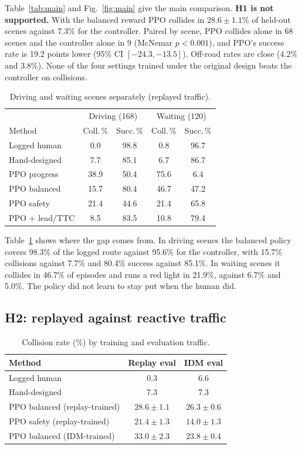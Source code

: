 \documentclass[conference]{IEEEtran}
\newcommand{\pp}{\phantom{0}}
\begin{document}
Table~\ref{tab:main} and Fig.~\ref{fig:main} give the main comparison. \textbf{H1 is not
supported.} With the balanced reward PPO collides in $28.6\pm1.1$\% of held-out scenes
against 7.3\% for the controller. Paired by scene, PPO collides alone in 68 scenes and
the controller alone in 9 (McNemar $p<0.001$), and PPO's success rate is 19.2 points
lower (95\% CI $[-24.3,-13.5]$). Off-road rates are close (4.2\% and 3.8\%). None of the
four settings trained under the original design beats the controller on collisions.

\begin{table}[t]
\caption{Driving and waiting scenes separately (replayed traffic).}\label{tab:split}
\centering\small
\begin{tabular}{@{}lcccc@{}}
\toprule
 & \multicolumn{2}{c}{Driving (168)} & \multicolumn{2}{c}{Waiting (120)} \\
Method & Coll.\,\% & Succ.\,\% & Coll.\,\% & Succ.\,\% \\
\midrule
Logged human & 0.0 & 98.8 & 0.8 & 96.7 \\
Hand-designed & 7.7 & 85.1 & 6.7 & 86.7 \\
PPO progress & 38.9 & 50.4 & 75.6 & \pp6.4 \\
PPO balanced & 15.7 & 80.4 & 46.7 & 47.2 \\
PPO safety & 21.4 & 44.6 & 21.4 & 65.8 \\
PPO + lead/TTC & \pp8.5 & 83.5 & 10.8 & 79.4 \\
\bottomrule
\end{tabular}
\end{table}

Table~\ref{tab:split} shows where the gap comes from. In driving scenes the balanced
policy covers 98.3\% of the logged route against 95.6\% for the controller, with 15.7\%
collisions against 7.7\% and 80.4\% success against 85.1\%. In waiting scenes it collides
in 46.7\% of episodes and runs a red light in 21.9\%, against 6.7\% and 5.0\%. The policy
did not learn to stay put when the human did.

\subsection{H2: replayed against reactive traffic}\label{sec:h2}

\begin{table}[t]
\caption{Collision rate (\%) by training and evaluation traffic.}\label{tab:h2}
\centering\small
\begin{tabular}{@{}lcc@{}}
\toprule
Method & Replay eval & IDM eval \\
\midrule
Logged human & 0.3 & 6.6 \\
Hand-designed & 7.3 & 7.3 \\
PPO balanced (replay-trained) & $28.6\pm1.1$ & $26.3\pm0.6$ \\
PPO safety (replay-trained) & $21.4\pm1.3$ & $14.0\pm1.3$ \\
PPO balanced (IDM-trained) & $33.0\pm2.3$ & $23.8\pm0.4$ \\
\bottomrule
\end{tabular}
\end{table}
\end{document}
